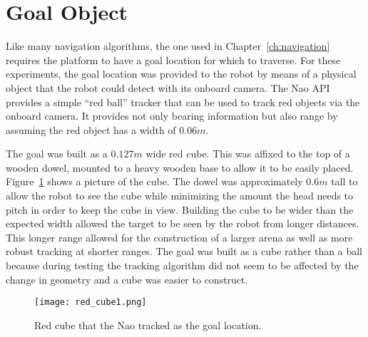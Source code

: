 \section{Goal Object}
Like many navigation algorithms, the one used in Chapter~\ref{ch:navigation}
requires the platform to have a goal location for which to traverse.
For these experiments, the goal location was provided to the robot by means
of a physical object that the robot could detect with its onboard camera.
The Nao API provides a simple ``red ball'' tracker that can be used to track
red objects via the onboard camera. It provides not only bearing information
but also range by assuming the red object has a width of $0.06 m$.

The goal was built as a $0.127 m$ wide red cube. 
This was affixed to the top of a wooden dowel, mounted to a heavy wooden base to 
allow it to be easily placed.
Figure~\ref{fig:red_cube1} shows a picture of the cube.
The dowel was approximately $0.6 m$ tall to allow the robot to see the cube
while minimizing the amount the head needs to pitch in order to keep 
the cube in view. Building the cube to be wider than the 
expected width allowed the target to be seen by the robot from longer distances. 
This longer range allowed for the construction of a larger arena as well as more 
robust tracking at shorter ranges.
The goal was built as a cube rather than a ball because during testing 
the tracking algorithm did not seem to be affected by the change in geometry 
and a cube was easier to construct. 

\begin{figure}
\centering
\texttt{[image: red\_cube1.png]}
\caption{Red cube that the Nao tracked as the goal location.}
\label{fig:red_cube1}
\end{figure}
